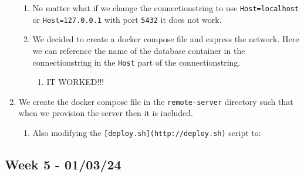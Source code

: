 \begin{enumerate}
    \begin{enumerate}
    \item No matter what if we change the connectionstring to use \texttt{Host=localhost} or \texttt{Host=127.0.0.1} with port \texttt{5432} it does not work.
    \item We decided to create a docker compose file and express the network. Here we can reference the name of the database container in the connectionstring in the \texttt{Host} part of the connectionstring.

        \begin{enumerate}
            \item IT WORKED!!!
        \end{enumerate}
    \end{enumerate}
    \item We create the docker compose file in the \texttt{remote-server} directory such that when we provision the server then it is included.

    \begin{enumerate}
        \item Also modifying the \texttt{{[}deploy.sh{]}(http://deploy.sh)} script to:


    \end{enumerate}
\end{enumerate}

\subsection{Week 5 - 01/03/24}
\label{log:week5}

